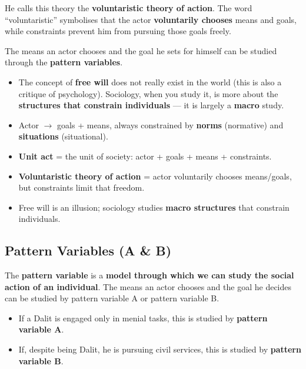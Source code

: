 He calls this theory the \textbf{voluntaristic theory of action}. The word ``voluntaristic'' symbolises that the actor \textbf{voluntarily chooses} means and goals, while constraints prevent him from pursuing those goals freely.

The means an actor chooses and the goal he sets for himself can be studied through the \textbf{pattern variables}.

\begin{CriticalPoint}
\begin{itemize}
\item The concept of \textbf{free will} does not really exist in the world (this is also a critique of psychology). Sociology, when you study it, is more about the \textbf{structures that constrain individuals} --- it is largely a \textbf{macro} study.
\end{itemize}
\end{CriticalPoint}

\begin{QuickRevision}
\begin{itemize}
\item Actor $\rightarrow$ goals + means, always constrained by \textbf{norms} (normative) and \textbf{situations} (situational).
\item \textbf{Unit act} = the unit of society: actor + goals + means + constraints.
\item \textbf{Voluntaristic theory of action} = actor voluntarily chooses means/goals, but constraints limit that freedom.
\item Free will is an illusion; sociology studies \textbf{macro structures} that constrain individuals.
\end{itemize}
\end{QuickRevision}

\sectiondivider

\subsection{Pattern Variables (A \& B)}

The \textbf{pattern variable} is a \textbf{model through which we can study the social action of an individual}. The means an actor chooses and the goal he decides can be studied by pattern variable A or pattern variable B.

\begin{ExampleBox}
\begin{itemize}
\item If a Dalit is engaged only in menial tasks, this is studied by \textbf{pattern variable A}.
\item If, despite being Dalit, he is pursuing civil services, this is studied by \textbf{pattern variable B}.
\end{itemize}
\end{ExampleBox}

